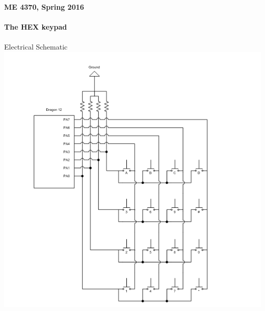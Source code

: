 \documentclass[11pt]{article}
\begin{document}
	\textbf{\LARGE ME 4370, Spring 2016} \\\\
	\textbf{\LARGE The HEX keypad} \\\\
		Electrical Schematic\\
		\includegraphics[scale=.85]{fig_schematic.png}\\
		
\end{document}
